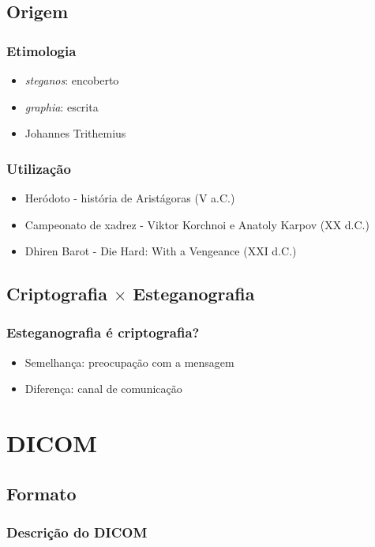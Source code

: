 \documentclass{beamer}
\begin{document}
\subsection{Origem}
\begin{frame}
\frametitle{Etimologia}
\begin{itemize}
\item \textit{steganos}: encoberto 
\item \textit{graphia}: escrita
\item Johannes Trithemius 
\end{itemize}
\end{frame}

\begin{frame}
\frametitle{Utilização}
\begin{itemize}
\item Heródoto - história de Aristágoras (V a.C.)
\item Campeonato de xadrez - Viktor Korchnoi e Anatoly Karpov (XX d.C.)
\item Dhiren Barot - Die Hard: With a Vengeance (XXI d.C.)
\end{itemize}
\end{frame}




\subsection{Criptografia $\times$ Esteganografia}
\begin{frame}
\frametitle{Esteganografia é criptografia?}
\begin{itemize}
\item Semelhança: preocupação com a mensagem
\item Diferença: canal de comunicação
\end{itemize}
\end{frame}

\section{DICOM}
\subsection{Formato}
\begin{frame}
\frametitle{Descrição do DICOM}

\end{frame}
\end{document}
